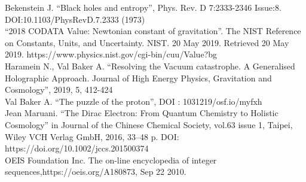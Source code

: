 \documentclass[a4paper,9pt]{article}
\begin{document}
\begin{thebibliography}{99}

 Bekenstein J. ``Black holes and entropy'', Phys. Rev. D 7:2333-2346 Issue:8. DOI:10.1103/PhysRevD.7.2333 (1973) \\

 ``2018 CODATA Value: Newtonian constant of gravitation''. The NIST Reference on Constants, Units, and Uncertainty. NIST. 20 May 2019. Retrieved 20 May 2019. https://www.physics.nist.gov/cgi-bin/cuu/Value?bg \\


 Haramein N., Val Baker A. ``Resolving the Vacuum catastrophe. A Generalised Holographic Approach. Journal of High Energy Physics, Gravitation and Cosmology'', 2019, 5, 412-424 \\ 

 Val Baker A. ``The puzzle of the proton'', DOI : 1031219/osf.io/myfxh \\

 Jean Maruani. ``The Dirac Electron: From Quantum Chemistry to Holistic Cosmology'' in Journal of the Chinese Chemical Society, vol.63 issue 1, Taipei, Wiley VCH Verlag GmbH, 2016, 33--48 p. DOI: https://doi.org/10.1002/jccs.201500374 \\

 OEIS Foundation Inc. The on-line encyclopedia of integer sequences,https://oeis.org/A180873, Sep 22 2010.

\end{thebibliography}
\end{document}
